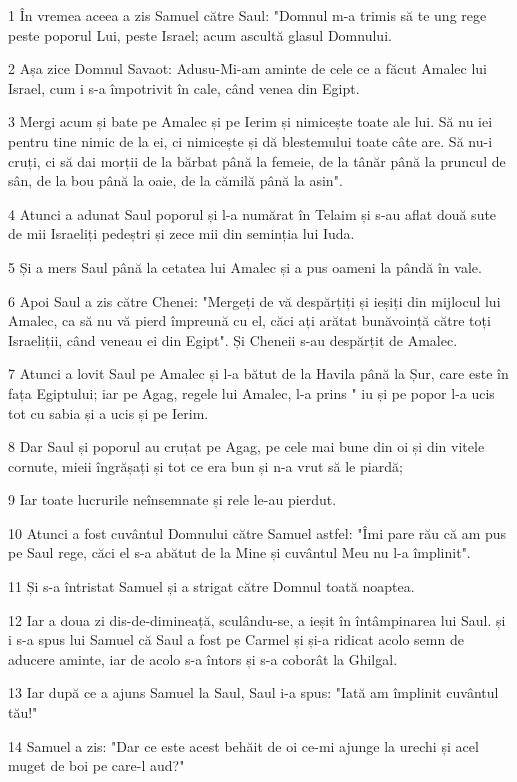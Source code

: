 \par 1 În vremea aceea a zis Samuel către Saul: "Domnul m-a trimis să te ung rege peste poporul Lui, peste Israel; acum ascultă glasul Domnului.
\par 2 Așa zice Domnul Savaot: Adusu-Mi-am aminte de cele ce a făcut Amalec lui Israel, cum i s-a împotrivit în cale, când venea din Egipt.
\par 3 Mergi acum și bate pe Amalec și pe Ierim și nimicește toate ale lui. Să nu iei pentru tine nimic de la ei, ci nimicește și dă blestemului toate câte are. Să nu-i cruți, ci să dai morții de la bărbat până la femeie, de la tânăr până la pruncul de sân, de la bou până la oaie, de la cămilă până la asin".
\par 4 Atunci a adunat Saul poporul și l-a numărat în Telaim și s-au aflat două sute de mii Israeliți pedeștri și zece mii din seminția lui Iuda.
\par 5 Și a mers Saul până la cetatea lui Amalec și a pus oameni la pândă în vale.
\par 6 Apoi Saul a zis către Chenei: "Mergeți de vă despărțiți și ieșiți din mijlocul lui Amalec, ca să nu vă pierd împreună cu el, căci ați arătat bunăvoință către toți Israeliții, când veneau ei din Egipt". Și Cheneii s-au despărțit de Amalec.
\par 7 Atunci a lovit Saul pe Amalec și l-a bătut de la Havila până la Șur, care este în fața Egiptului; iar pe Agag, regele lui Amalec, l-a prins " iu și pe popor l-a ucis tot cu sabia și a ucis și pe Ierim.
\par 8 Dar Saul și poporul au cruțat pe Agag, pe cele mai bune din oi și din vitele cornute, mieii îngrășați și tot ce era bun și n-a vrut să le piardă;
\par 9 Iar toate lucrurile neînsemnate și rele le-au pierdut.
\par 10 Atunci a fost cuvântul Domnului către Samuel astfel: "Îmi pare rău că am pus pe Saul rege, căci el s-a abătut de la Mine și cuvântul Meu nu l-a împlinit".
\par 11 Și s-a întristat Samuel și a strigat către Domnul toată noaptea.
\par 12 Iar a doua zi dis-de-dimineață, sculându-se, a ieșit în întâmpinarea lui Saul. și i s-a spus lui Samuel că Saul a fost pe Carmel și și-a ridicat acolo semn de aducere aminte, iar de acolo s-a întors și s-a coborât la Ghilgal.
\par 13 Iar după ce a ajuns Samuel la Saul, Saul i-a spus: "Iată am împlinit cuvântul tău!"
\par 14 Samuel a zis: "Dar ce este acest behăit de oi ce-mi ajunge la urechi și acel muget de boi pe care-l aud?"
